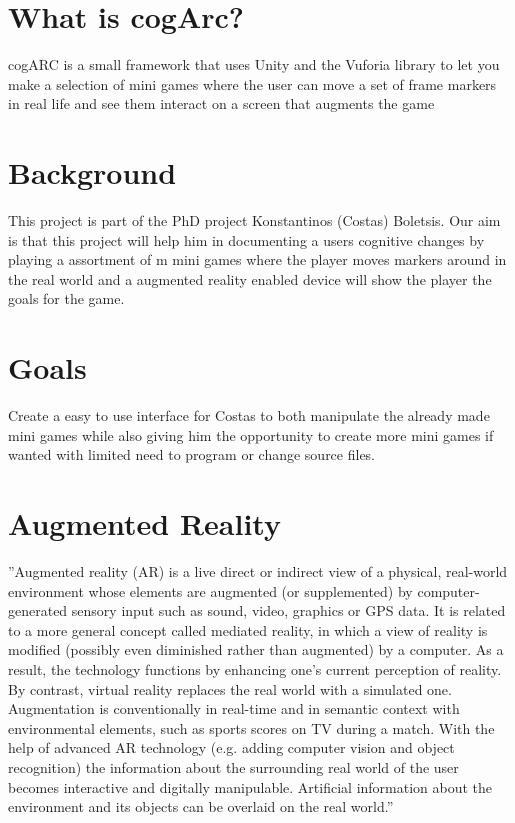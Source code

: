 \section{What is cogArc?}
cogARC is a small framework that uses Unity and the Vuforia library to let you make a selection of mini games where the user can move a set of frame markers in real life and see them interact on a screen that augments the game

\section{Background}
This project is part of the PhD project Konstantinos (Costas) Boletsis. Our aim is that this project will help him in documenting a users cognitive changes by playing a assortment of m mini games where the player moves markers around in the real world and a augmented reality enabled device will show the player the goals for the game.

\section{Goals}
Create a easy to use interface for Costas to both manipulate the already made mini games while also giving him the opportunity to create more mini games if wanted with limited need to program or change source files.

\section{Augmented Reality}
''Augmented reality (AR) is a live direct or indirect view of a physical, real-world environment whose elements are augmented (or supplemented) by computer-generated sensory input such as sound, video, graphics or GPS data. It is related to a more general concept called mediated reality, in which a view of reality is modified (possibly even diminished rather than augmented) by a computer. As a result, the technology functions by enhancing one’s current perception of reality. By contrast, virtual reality replaces the real world with a simulated one. Augmentation is conventionally in real-time and in semantic context with environmental elements, such as sports scores on TV during a match. With the help of advanced AR technology (e.g. adding computer vision and object recognition) the information about the surrounding real world of the user becomes interactive and digitally manipulable. Artificial information about the environment and its objects can be overlaid on the real world.''\cite{WikiAugmentedReality}
